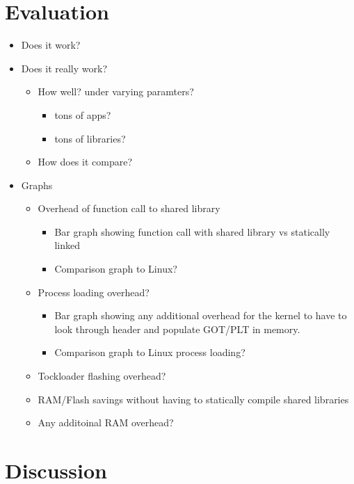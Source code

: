 \documentclass{article}
\begin{document}
\section*{Evaluation}
\begin{itemize}
    \item Does it work?
    \item Does it really work?
        \begin{itemize}
            \item How well? under varying paramters?
            \begin{itemize}
                \item tons of apps?
                \item tons of libraries?
            \end{itemize}
            \item How does it compare?
        \end{itemize}
    \item Graphs
        \begin{itemize}
            \item Overhead of function call to shared library
                \begin{itemize}
                    \item Bar graph showing function call with shared library vs statically linked
                    \item Comparison graph to Linux?
                \end{itemize}
            \item Process loading overhead? 
                \begin{itemize}
                    \item Bar graph showing any additional overhead for the kernel to have to look through header and populate GOT/PLT in memory.
                    \item Comparison graph to Linux process loading?
                \end{itemize}
            \item Tockloader flashing overhead? 
            \item RAM/Flash savings without having to statically compile shared libraries
            \item Any additoinal RAM overhead?
        \end{itemize}
\end{itemize}
\section*{Discussion}
\end{document}
